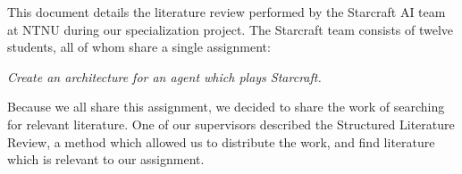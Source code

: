 
This document details the literature review performed by the Starcraft AI team at NTNU during our specialization project.  The Starcraft team consists of twelve students, all of whom share a single assignment:

\emph{Create an architecture for an agent which plays Starcraft.}

Because we all share this assignment, we decided to share the work of searching for relevant literature.  One of our supervisors described the Structured Literature Review, a method which allowed us to distribute the work, and find literature which is relevant to our assignment.










